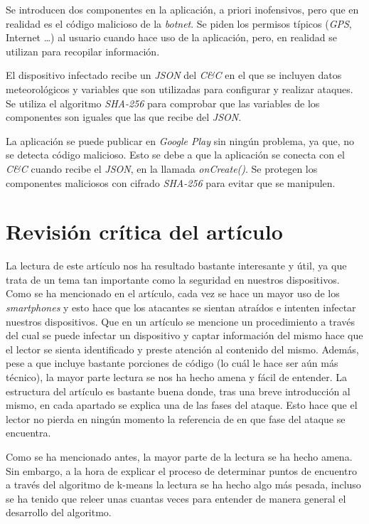 \documentclass[a4paper,11pt]{report}
\begin{document}
Se introducen dos componentes en la aplicación, a priori inofensivos, pero que en realidad es el código malicioso de la \emph{botnet}. Se piden los permisos típicos (\emph{GPS}, Internet \ldots) al usuario cuando hace uso de la aplicación, pero, en realidad se utilizan para recopilar información.

El dispositivo infectado recibe un \emph{JSON} del \emph{C\&{}C} en el que se incluyen datos meteorológicos y variables que son utilizadas para configurar y realizar ataques. Se utiliza el algoritmo \emph{SHA-256} para comprobar que las variables de los componentes son iguales que las que recibe del \emph{JSON}.

La aplicación se puede publicar en \emph{Google Play} sin ningún problema, ya que, no se detecta código malicioso. Esto se debe a que la aplicación se conecta con el \emph{C\&{}C} cuando recibe el \emph{JSON}, en la llamada \emph{onCreate()}. Se protegen los componentes maliciosos con cifrado \emph{SHA-256} para evitar que se manipulen.



\chapter{Revisión crítica del artículo}\label{Critica}

La lectura de este artículo nos ha resultado bastante interesante y útil, ya que trata de un tema tan importante como la seguridad en nuestros dispositivos. Como se ha mencionado en el artículo, cada vez se hace un mayor uso de los \emph{smartphones} y esto hace que los atacantes se sientan atraídos e intenten infectar nuestros dispositivos. Que en un artículo se mencione un procedimiento a través del cual se puede infectar un dispositivo y captar información del mismo hace que el lector se sienta identificado y preste atención al contenido del mismo. Además, pese a que incluye bastante porciones de código (lo cuál le hace ser aún más técnico), la mayor parte lectura se nos ha hecho amena y fácil de entender. La estructura del artículo es bastante buena donde, tras una breve introducción al mismo, en cada apartado se explica una de las fases del ataque. Esto hace que el lector no pierda en ningún momento la referencia de en que fase del ataque se encuentra. 

Como se ha mencionado antes, la mayor parte de la lectura se ha hecho amena. Sin embargo, a la hora de explicar el proceso de determinar puntos de encuentro a través del algoritmo de k-means la lectura se ha hecho algo más pesada, incluso se ha tenido que releer unas cuantas veces para entender de manera general el desarrollo del algoritmo. 
\end{document}
